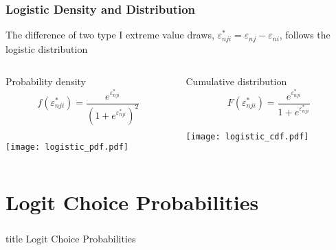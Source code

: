 \documentclass{beamer}
\begin{document}
\begin{frame}\frametitle{Logistic Density and Distribution}
    The difference of two type I extreme value draws, $\varepsilon_{nji}^* = \varepsilon_{nj} - \varepsilon_{ni}$, follows the logistic distribution
    \begin{columns}
		\begin{column}{0.5\textwidth}
			\begin{center}
				Probability density \\
				\vspace{-4ex}
				$$f(\varepsilon_{nji}^*) = \frac{e^{\varepsilon_{nji}^*}}{\left( 1 + e^{\varepsilon_{nji}^*} \right)^2}$$ \\
				\vspace{-2ex}
				\texttt{[image: logistic\_pdf.pdf]}      
			\end{center}
		\end{column}
		\begin{column}{0.5\textwidth}
    		\begin{center}
     			Cumulative distribution \\
     			\vspace{-4ex}
     			$$F(\varepsilon_{nji}^*) = \frac{e^{\varepsilon_{nji}^*}}{1 + e^{\varepsilon_{nji}^*}}$$ \\
     			\vspace{0ex}
				\texttt{[image: logistic\_cdf.pdf]}          
     		\end{center}
		\end{column}
	\end{columns}
\end{frame}

\section{Logit Choice Probabilities}
\label{probs}
\begin{frame}\frametitle{}
    \vfill
    \centering
    \begin{beamercolorbox}[center]{title}
        \Large Logit Choice Probabilities
    \end{beamercolorbox}
    \vfill
\end{frame}
\end{document}
